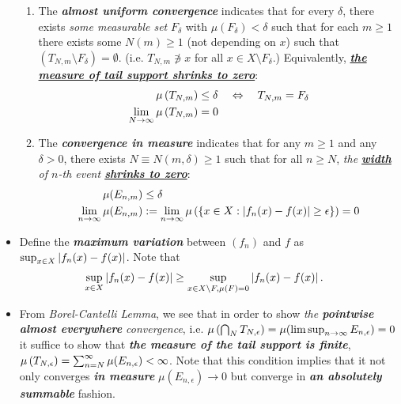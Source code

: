 \documentclass[11pt]{article}
\begin{document}
\begin{itemize}
\begin{remark}
\begin{enumerate}
\item The \emph{\textbf{almost uniform convergence}}  indicates that for every $\delta$, there exists \emph{some measurable set} $F_{\delta}$ with $\mu(F_{\delta}) < \delta$ such that  for each $m\ge 1$ there exists some $N(m)\ge 1$ (not depending on $x$) such that $(T_{N,m} \setminus F_{\delta}) = \emptyset$. (i.e. $T_{N,m} \not\ni x$ for all $x \in X \setminus F_{\delta}$.) Equivalently, \emph{\textbf{\underline{the measure of  tail support shrinks to zero}}}:
\begin{align*}
\mu\left(T_{N,m}\right) &\le \delta  \quad \Leftrightarrow \quad T_{N,m} = F_\delta\\
\lim\limits_{N\rightarrow \infty}\mu\left(T_{N,m}\right) &=0
\end{align*} 


\item The \emph{\textbf{convergence in measure}} indicates that for any $m\ge 1$ and any $\delta > 0$, there exists $N \equiv N(m, \delta)\ge 1$ such that for all $n \ge N$, \emph{the \underline{\textbf{width}} of $n$-th event \underline{\textbf{shrinks to zero}}}:
\begin{align*}
\mu(E_{n,m}) &\le \delta \\
 \lim\limits_{n\rightarrow \infty}\mu(E_{n, m}) &:=  \lim\limits_{n\rightarrow \infty}\mu\left(\left\{x \in X: \left\lvert f_n(x) - f(x) \right\rvert \ge \epsilon\right\} \right) =0 
\end{align*} 
\end{enumerate}
\end{remark}

\item \begin{definition}
Define the \emph{\textbf{maximum variation}} between $(f_n)$ and $f$ as $ \sup_{x\in X}\left\lvert f_{n}(x)- f(x) \right\rvert$. Note that 
\begin{align*}
 \sup\limits_{x\in X}\left\lvert f_{n}(x)- f(x) \right\rvert &\ge \sup_{x\in X\setminus F, \mu(F) =0}\left\lvert f_{n}(x)- f(x) \right\rvert.
\end{align*}
\end{definition}

\item \begin{remark}
From \emph{Borel-Cantelli Lemma}, we see that in order to show \emph{the \textbf{pointwise almost everywhere} convergence}, i.e.  $\mu\left(\bigcap_{N}T_{N,\epsilon}\right) =\mu(\limsup_{n \rightarrow \infty}E_{n, \epsilon})= 0$ it suffice to show that \emph{\textbf{the measure of the tail support is finite}}, $\mu\left(T_{N,\epsilon}\right) = \sum_{n=N}^{\infty}\mu(E_{n, \epsilon}) < \infty$. Note that this condition implies that it not only converges \emph{\textbf{in measure}} $\mu(E_{n, \epsilon}) \rightarrow 0$ but converge in \textbf{\emph{an absolutely summable}} fashion.
\end{remark}
\end{itemize}
\end{document}
